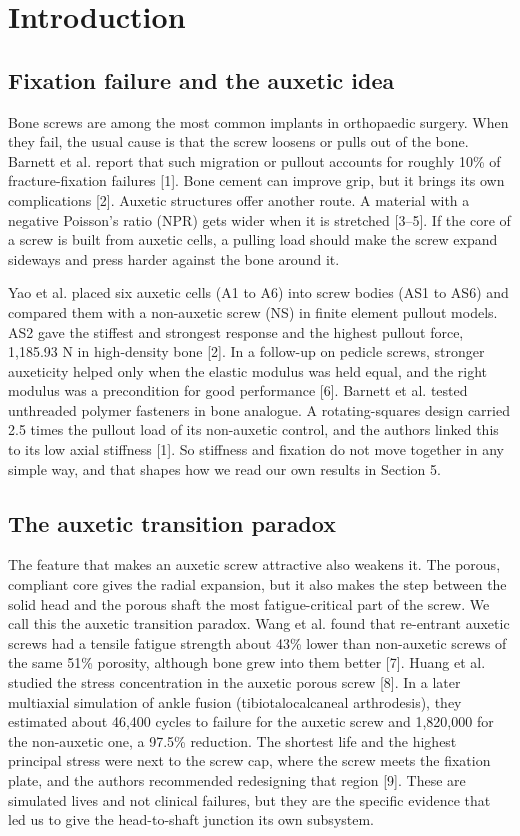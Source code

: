 \documentclass[10pt,twocolumn,letterpaper]{article}
\begin{document}
\section{Introduction}
\subsection{Fixation failure and the auxetic idea}
Bone screws are among the most common implants in orthopaedic surgery. When they fail, the usual cause is that the screw loosens or pulls out of the bone. Barnett et al. report that such migration or pullout accounts for roughly 10\% of fracture-fixation failures [1]. Bone cement can improve grip, but it brings its own complications [2]. Auxetic structures offer another route. A material with a negative Poisson's ratio (NPR) gets wider when it is stretched [3--5]. If the core of a screw is built from auxetic cells, a pulling load should make the screw expand sideways and press harder against the bone around it.

Yao et al. placed six auxetic cells (A1 to A6) into screw bodies (AS1 to AS6) and compared them with a non-auxetic screw (NS) in finite element pullout models. AS2 gave the stiffest and strongest response and the highest pullout force, 1,185.93 N in high-density bone [2]. In a follow-up on pedicle screws, stronger auxeticity helped only when the elastic modulus was held equal, and the right modulus was a precondition for good performance [6]. Barnett et al. tested unthreaded polymer fasteners in bone analogue. A rotating-squares design carried 2.5 times the pullout load of its non-auxetic control, and the authors linked this to its low axial stiffness [1]. So stiffness and fixation do not move together in any simple way, and that shapes how we read our own results in Section 5.

\subsection{The auxetic transition paradox}
The feature that makes an auxetic screw attractive also weakens it. The porous, compliant core gives the radial expansion, but it also makes the step between the solid head and the porous shaft the most fatigue-critical part of the screw. We call this the auxetic transition paradox. Wang et al. found that re-entrant auxetic screws had a tensile fatigue strength about 43\% lower than non-auxetic screws of the same 51\% porosity, although bone grew into them better [7]. Huang et al. studied the stress concentration in the auxetic porous screw [8]. In a later multiaxial simulation of ankle fusion (tibiotalocalcaneal arthrodesis), they estimated about 46,400 cycles to failure for the auxetic screw and 1,820,000 for the non-auxetic one, a 97.5\% reduction. The shortest life and the highest principal stress were next to the screw cap, where the screw meets the fixation plate, and the authors recommended redesigning that region [9]. These are simulated lives and not clinical failures, but they are the specific evidence that led us to give the head-to-shaft junction its own subsystem.
\end{document}
